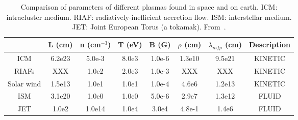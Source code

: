 \begin{table}
  \begin{tabular}{c|c|c|c|c|c|c|c}  
    & L (cm) & n (cm$^{-3}$) & T (eV) & B (G) & $\rho$ (cm) & $\lambda_{mfp}$ (cm) & Description \\ \hline\hline
    ICM & 6.2e23 & 5.0e-3 & 8.0e3 & 1.0e-6 & 1.3e10 & 9.5e21 & KINETIC \\ 
    RIAFs & XXX & 1.0e2 & 2.0e3 & 1.0e-3 & XXX & XXX & KINETIC \\ 
    Solar wind & 1.5e13 & 1.0e1 & 1.0e1 & 1.0e-4 & 4.6e6 & 1.2e13 & KINETIC  \\ \hline
    ISM & 3.1e20 & 1.0e0 & 1.0e0 & 5.0e-6 & 2.9e7 & 1.3e12 & FLUID \\ 
    JET & 1.0e2 & 1.0e14 & 1.0e4 & 3.0e4 & 4.8e-1 & 1.4e6 & FLUID  \\ 
  \end{tabular}
  \caption{Comparison of parameters of different plasmas found in space and on earth. ICM: intracluster medium. RIAF: radiatively-inefficient accretion flow. ISM: interstellar medium. JET: Joint European Torus (a tokamak). From~\cite{KunzFM,AST521Pset1}.}
  \label{table:paramCompare}
\end{table}

